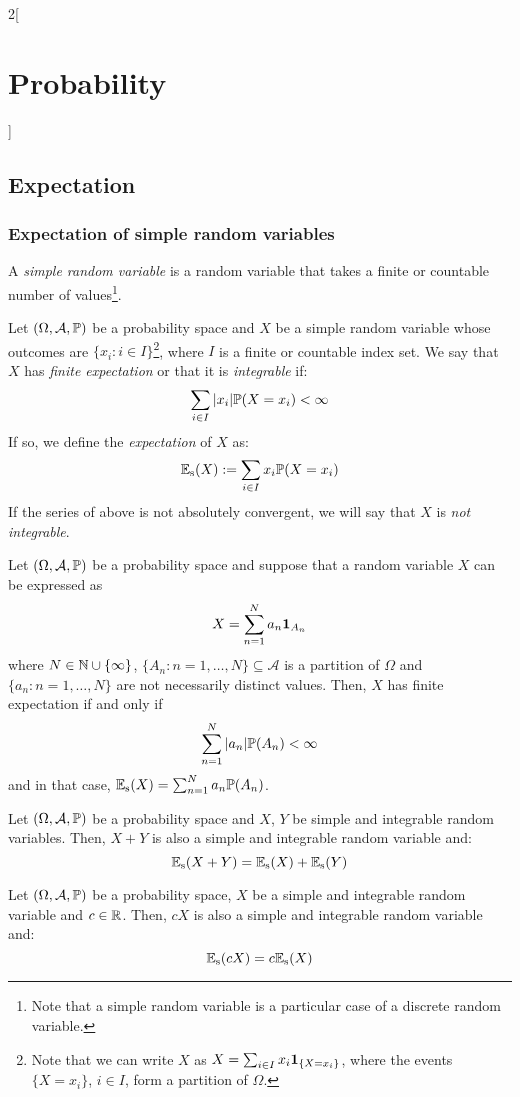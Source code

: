 \documentclass[../../../main.tex]{subfiles}
\begin{document}
\begin{multicols}{2}[\section{Probability}]
  \subsection{Expectation}\label{P_exp}
  \subsubsection{Expectation of simple random variables}
  \begin{definition}
    A \emph{simple random variable} is a random variable that takes a finite or countable number of values\footnote{Note that a simple random variable is a particular case of a discrete random variable.}.
  \end{definition}
  \begin{definition}
    Let $(\Omega,\mathcal{A},\mathbb{P})$ be a probability space and $X$ be a simple random variable whose outcomes are $\{x_i:i\in I\}$\footnote{Note that we can write $X$ as $X=\sum_{i\in I}x_i\boldsymbol{\mathrm{1}}_{\{X=x_i\}}$, where the events $\{X=x_i\}$, $i\in I$, form a partition of $\Omega$.}, where $I$ is a finite or countable index set. We say that $X$ has \emph{finite expectation} or that it is \emph{integrable} if: $$\sum_{i\in I}|x_i|\mathbb{P}(X=x_i)<\infty$$
    If so, we define the \emph{expectation} of $X$ as: $$\mathbb{E}_\text{s}(X):=\sum_{i\in I}x_i\mathbb{P}(X=x_i)$$ If the series of above is not absolutely convergent, we will say that $X$ is \emph{not integrable}.
  \end{definition}
  \begin{lemma}
    Let $(\Omega,\mathcal{A},\mathbb{P})$ be a probability space and suppose that a random variable $X$ can be expressed as $$X=\sum_{n=1}^Na_n\boldsymbol{\mathrm{1}}_{A_n}$$ where $N\in\mathbb{N}\cup\{\infty\}$, $\{A_n:n=1,\ldots,N\}\subseteq\mathcal{A}$ is a partition of $\Omega$ and $\{a_n:n=1,\ldots,N\}$ are not necessarily distinct values. Then, $X$ has finite expectation if and only if $$\sum_{n=1}^N|a_n|\mathbb{P}(A_n)<\infty$$ and in that case, $\mathbb{E}_\text{s}(X)=\sum_{n=1}^Na_n\mathbb{P}(A_n)$.
  \end{lemma}
  \begin{proposition}
    Let $(\Omega,\mathcal{A},\mathbb{P})$ be a probability space and $X$, $Y$ be simple and integrable random variables. Then, $X+Y$ is also a simple and integrable random variable and: $$\mathbb{E}_\text{s}(X+Y)=\mathbb{E}_\text{s}(X)+\mathbb{E}_\text{s}(Y)$$
  \end{proposition}
  \begin{proposition}
    Let $(\Omega,\mathcal{A},\mathbb{P})$ be a probability space, $X$ be a simple and integrable random variable and $c\in\mathbb{R}$. Then, $cX$ is also a simple and integrable random variable and: $$\mathbb{E}_\text{s}(cX)=c\mathbb{E}_\text{s}(X)$$

\end{proposition}
\end{multicols}
\end{document}
